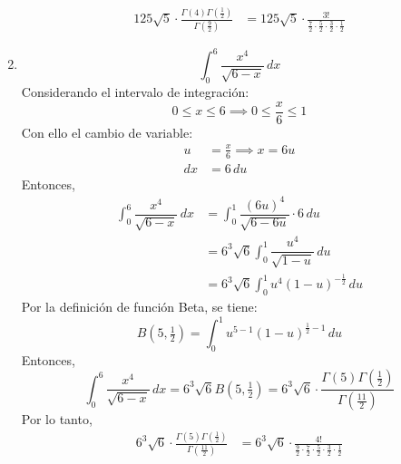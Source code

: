 \begin{multicols}{2}
\begin{enumerate}
\[    \begin{aligned}
      125 \sqrt{5} \cdot \frac{\Gamma(4)\Gamma(\tfrac{1}{2})}{\Gamma(\tfrac{9}{2})} &= 125 \sqrt{5} \cdot \frac{3!}{\frac{7}{2} \cdot \frac{5}{2} \cdot \frac{3}{2} \cdot \frac{1}{2}}
    \end{aligned}
  \]
  \columnbreak
  \item \[
    \displaystyle \int_{0}^{6} \dfrac{x^{4}}{\sqrt{6-x}} \, dx
  \]
  Considerando el intervalo de integración:
  \[
    0 \leq x \leq 6 \implies 0 \leq \frac{x}{6} \leq 1
  \]
  Con ello el cambio de variable:
  \[
    \begin{aligned}
      u &= \frac{x}{6} \implies x = 6u \\
      dx &= 6 \, du
    \end{aligned}
  \]
  Entonces,
  \[
    \begin{aligned}
      \int_{0}^{6} \dfrac{x^{4}}{\sqrt{6-x}} \, dx &= \int_{0}^{1} \dfrac{(6u)^{4}}{\sqrt{6-6u}} \cdot 6 \, du \\
      &= 6^{3} \sqrt{6} \int_{0}^{1} \dfrac{u^{4}}{\sqrt{1-u}} \, du \\
      &= 6^{3} \sqrt{6} \int_{0}^{1} u^{4} (1-u)^{-\frac{1}{2}} \, du
    \end{aligned}
  \]
  Por la definición de función Beta, se tiene:
  \[
    B(5, \tfrac{1}{2}) = \int_{0}^{1} u^{5-1} (1-u)^{\frac{1}{2}-1} \, du
  \]
  Entonces,
  \[
    \int_{0}^{6} \dfrac{x^{4}}{\sqrt{6-x}} \, dx = 6^{3} \sqrt{6} B(5, \tfrac{1}{2}) = 6^{3} \sqrt{6} \cdot \frac{\Gamma(5)\Gamma(\tfrac{1}{2})}{\Gamma(\tfrac{11}{2})}
  \]
  Por lo tanto,
  \[
    \begin{aligned}
      6^{3} \sqrt{6} \cdot \frac{\Gamma(5)\Gamma(\tfrac{1}{2})}{\Gamma(\tfrac{11}{2})} &= 6^{3} \sqrt{6} \cdot \frac{4!}{\frac{9}{2} \cdot \frac{7}{2} \cdot \frac{5}{2} \cdot \frac{3}{2} \cdot \frac{1}{2}}
    \end{aligned}
  \]
  \end{enumerate}
\newpage

\end{multicols}
